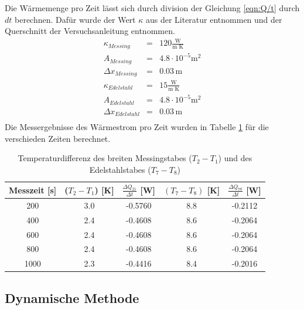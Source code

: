 Die Wärmemenge pro Zeit lässt sich durch division der Gleichung \ref{eqn:Q/t} durch $dt$ berechnen. Dafür wurde der Wert $\kappa$ aus der Literatur entnommen und der Querschnitt der Versuchsanleitung entnommen.
\begin{eqnarray*} 
		 \kappa_{Messing} 	& =& 120 \frac{\text{W}}{\text{m K}}  		\\
		 A_{Messing} 		& =& 4.8 \cdot 10^{-5} \text{m}^2		\\
		 \Delta x_{Messing}	& =& 0.03 \, \text{m}				\\
		 \kappa_{Edelstahl}	& =& 15\frac{\text{W}}{\text{m K}}      	\\
                 A_{Edelstahl}          & =& 4.8 \cdot 10^{-5}\text{m}^2           	\\
                 \Delta x_{Edelstahl}   & =& 0.03 \, \text{m}           		\\
\end{eqnarray*}
Die Messergebnisse des Wärmestrom pro Zeit wurden in Tabelle \ref{tab:wärmestrom} für die verschieden Zeiten berechnet.
\begin{table}
	\centering
	\caption{Temperaturdifferenz des breiten Messingstabes ($T_2 - T_1$) und des Edelstahlstabes ($T_7 - T_8$)}
	\label{tab:wärmestrom}
	\begin{tabular}{c c c c c}
		\toprule
		Messzeit [s] & ($T_2 - T_1$) [K] & $ \frac{\Delta Q_{21}}{\Delta t}$ [W] & $(T_7 - T_8)$ [K] & $ \frac{\Delta Q_{78}}{\Delta t}$ [W] \\
		\midrule
		200  & 3.0	& -0.5760 & 8.8	&-0.2112	\\
		400  & 2.4	& -0.4608 & 8.6	&-0.2064	\\
		600  & 2.4	& -0.4608 & 8.6	&-0.2064	\\
		800  & 2.4	& -0.4608 & 8.6	&-0.2064	\\
		1000 & 2.3	& -0.4416 & 8.4	&-0.2016	\\
		\bottomrule
	\end{tabular}
\end{table}

\subsection{Dynamische Methode}
